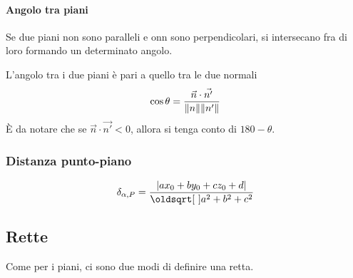 \paragraph{Angolo tra piani}
Se due piani non sono paralleli e onn sono perpendicolari, si intersecano fra di loro formando un
determinato angolo.
\begin{center}
\end{center}
L'angolo tra i due piani è pari a quello tra le due normali
\begin{equation*}
  \cos\theta=\frac{\vec{n}\cdot\vec{n'}}{\lVert n\rVert\lVert n'\rVert}
\end{equation*}
È da notare che se $\vec{n}\cdot\vec{n'}<0$, allora si tenga conto di $180-\theta$.
\subsubsection{Distanza punto-piano}
\begin{equation*}
  \delta_{\alpha,P} = \frac{\abs{ax_0+by_0+cz_0+d}}{\sqrt{a^2+b^2+c^2}}
\end{equation*}

\subsection{Rette}
Come per i piani, ci sono due modi di definire una retta.

